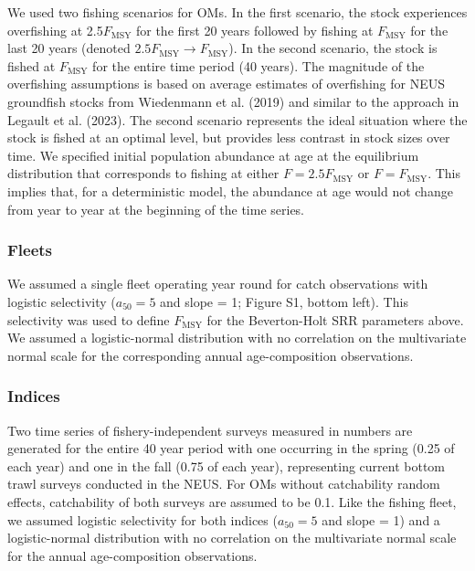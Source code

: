\documentclass[
  12pt,
]{article}
\newcommand{\Fmsy}{\ensuremath{F_{\text{MSY}}}\xspace}
\begin{document}
We used two fishing scenarios for OMs. In the first scenario, the stock
experiences overfishing at 2.5\Fmsy for the first 20 years followed by
fishing at \Fmsy for the last 20 years (denoted
\(2.5\Fmsy \rightarrow \Fmsy\)). In the second scenario, the stock is
fished at \Fmsy for the entire time period (40 years). The magnitude of
the overfishing assumptions is based on average estimates of overfishing
for NEUS groundfish stocks from Wiedenmann et al. (2019) and similar to
the approach in Legault et al. (2023). The second scenario represents
the ideal situation where the stock is fished at an optimal level, but
provides less contrast in stock sizes over time. We specified initial
population abundance at age at the equilibrium distribution that
corresponds to fishing at either \(F = 2.5\Fmsy\) or \(F = \Fmsy\). This
implies that, for a deterministic model, the abundance at age would not
change from year to year at the beginning of the time series.

\subsubsection*{Fleets}\label{fleets}

We assumed a single fleet operating year round for catch observations
with logistic selectivity (\(a_{50} = 5\) and slope = 1; Figure S1,
bottom left). This selectivity was used to define \Fmsy for the
Beverton-Holt SRR parameters above. We assumed a logistic-normal
distribution with no correlation on the multivariate normal scale for
the corresponding annual age-composition observations.

\subsubsection*{Indices}\label{indices}

Two time series of fishery-independent surveys measured in numbers are
generated for the entire 40 year period with one occurring in the spring
(0.25 of each year) and one in the fall (0.75 of each year),
representing current bottom trawl surveys conducted in the NEUS. For OMs
without catchability random effects, catchability of both surveys are
assumed to be 0.1. Like the fishing fleet, we assumed logistic
selectivity for both indices (\(a_{50} = 5\) and slope = 1) and a
logistic-normal distribution with no correlation on the multivariate
normal scale for the annual age-composition observations.
\end{document}
